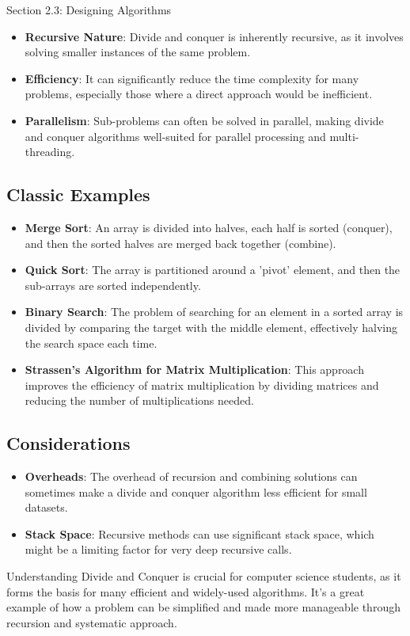 \begin{notes}{Section 2.3: Designing Algorithms}
    \begin{itemize}
        \item \textbf{Recursive Nature}: Divide and conquer is inherently recursive, as it involves solving smaller instances of the same problem.
        \item \textbf{Efficiency}: It can significantly reduce the time complexity for many problems, especially those where a direct approach would be inefficient.
        \item \textbf{Parallelism}: Sub-problems can often be solved in parallel, making divide and conquer algorithms well-suited for parallel processing and multi-threading.
    \end{itemize}

    \subsection*{Classic Examples}

    \begin{itemize}
        \item \textbf{Merge Sort}: An array is divided into halves, each half is sorted (conquer), and then the sorted halves are merged back together (combine).
        \item \textbf{Quick Sort}: The array is partitioned around a 'pivot' element, and then the sub-arrays are sorted independently.
        \item \textbf{Binary Search}: The problem of searching for an element in a sorted array is divided by comparing the target with the middle element, effectively halving the search space each time.
        \item \textbf{Strassen's Algorithm for Matrix Multiplication}: This approach improves the efficiency of matrix multiplication by dividing matrices and reducing the number of multiplications needed.
    \end{itemize}

    \subsection*{Considerations}

    \begin{itemize}
        \item \textbf{Overheads}: The overhead of recursion and combining solutions can sometimes make a divide and conquer algorithm less efficient for small datasets.
        \item \textbf{Stack Space}: Recursive methods can use significant stack space, which might be a limiting factor for very deep recursive calls.
    \end{itemize}

    Understanding Divide and Conquer is crucial for computer science students, as it forms the basis for many efficient and widely-used algorithms. It's a great example of how a problem can be simplified 
    and made more manageable through recursion and systematic approach.
\end{notes}

